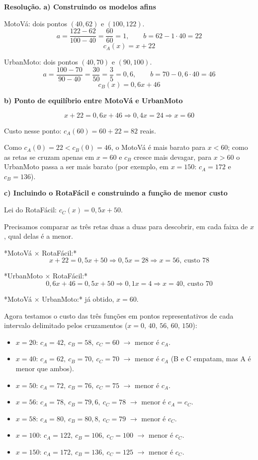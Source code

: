 \documentclass[11pt,a4paper]{article}
\begin{document}
\textbf{Resolução.} \textbf{a) Construindo os modelos afins}

MotoVá: dois pontos $(40,62)$ e $(100,122)$.
$$a=\frac{122-62}{100-40}=\frac{60}{60}=1,\qquad b=62-1\cdot 40=22$$
$$c_A(x)=x+22$$

UrbanMoto: dois pontos $(40,70)$ e $(90,100)$.
$$a=\frac{100-70}{90-40}=\frac{30}{50}=\frac{3}{5}=0{,}6,\qquad b=70-0{,}6\cdot 40=46$$
$$c_B(x)=0{,}6x+46$$

\textbf{b) Ponto de equilíbrio entre MotoVá e UrbanMoto}

$$x+22=0{,}6x+46 \Rightarrow 0{,}4x=24 \Rightarrow x=60$$

Custo nesse ponto: $c_A(60)=60+22=82$ reais.

Como $c_A(0)=22<c_B(0)=46$, o MotoVá é mais barato para $x<60$; como as retas se cruzam apenas em $x=60$ e $c_B$ cresce mais devagar, para $x>60$ o UrbanMoto passa a ser mais barato (por exemplo, em $x=150$: $c_A=172$ e $c_B=136$).

\textbf{c) Incluindo o RotaFácil e construindo a função de menor custo}

Lei do RotaFácil: $c_C(x)=0{,}5x+50$.

Precisamos comparar as três retas duas a duas para descobrir, em cada faixa de $x$, qual delas é a menor.

*MotoVá × RotaFácil:*
$$x+22=0{,}5x+50 \Rightarrow 0{,}5x=28 \Rightarrow x=56,\ \text{custo }78$$

*UrbanMoto × RotaFácil:*
$$0{,}6x+46=0{,}5x+50 \Rightarrow 0{,}1x=4 \Rightarrow x=40,\ \text{custo }70$$

*MotoVá × UrbanMoto:* já obtido, $x=60$.

Agora testamos o custo das três funções em pontos representativos de cada intervalo delimitado pelos cruzamentos ($x=0,\,40,\,56,\,60,\,150$):

\begin{itemize}[nosep,leftmargin=*]
\item $x=20$: $c_A=42,\ c_B=58,\ c_C=60$ $\to$ menor é $c_A$.
\item $x=40$: $c_A=62,\ c_B=70,\ c_C=70$ $\to$ menor é $c_A$ (B e C empatam, mas A é menor que ambos).
\item $x=50$: $c_A=72,\ c_B=76,\ c_C=75$ $\to$ menor é $c_A$.
\item $x=56$: $c_A=78,\ c_B=79{,}6,\ c_C=78$ $\to$ menor é $c_A=c_C$.
\item $x=58$: $c_A=80,\ c_B=80{,}8,\ c_C=79$ $\to$ menor é $c_C$.
\item $x=100$: $c_A=122,\ c_B=106,\ c_C=100$ $\to$ menor é $c_C$.
\item $x=150$: $c_A=172,\ c_B=136,\ c_C=125$ $\to$ menor é $c_C$.
\end{itemize}
\end{document}
